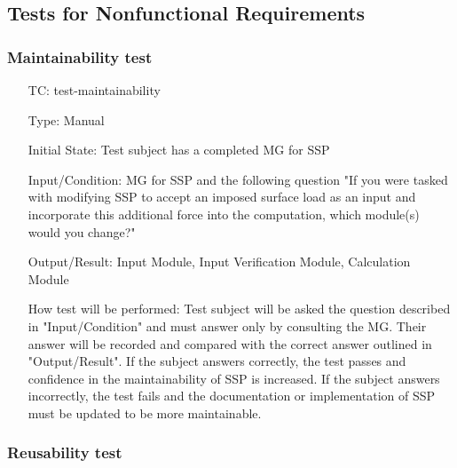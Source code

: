 \documentclass[12pt, titlepage]{article}
\newcounter{testnum} %
\newcommand{\progname}{SSP}
\begin{document}
\subsection{Tests for Nonfunctional Requirements} \label{sec_NFRTests}

\subsubsection{Maintainability test}

\begin{enumerate}[label=TC\arabic*:,ref={\arabic*}]
	
\item [TC\refstepcounter{testnum}\thetestnum: \label{TC_Maintainability}] 
test-maintainability

Type: Manual
					
Initial State: Test subject has a completed MG for \progname{}
					
Input/Condition: MG for \progname{} and the following question "If you were 
tasked with modifying \progname{} to accept an imposed surface load as an input 
and incorporate this additional force into the computation, which module(s) 
would you change?"
					
Output/Result: Input Module, Input Verification Module, Calculation Module

					
How test will be performed: Test subject will be asked the question described 
in "Input/Condition" and must answer only by consulting the MG. Their answer 
will be recorded and compared with the correct answer outlined in 
"Output/Result". If the subject answers correctly, the test passes and 
confidence in the maintainability of \progname{} is increased. If the subject 
answers incorrectly, the test fails and the documentation or implementation of 
\progname{} must be updated to be more maintainable.
					
\end{enumerate}

\subsubsection{Reusability test}
\end{document}
